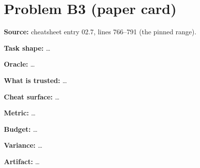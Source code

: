 \documentclass[11pt]{article}
\begin{document}
\section*{Problem B3 (paper card)}\label{ans:B3}
\begin{answer}
\textbf{Source:} cheatsheet entry 02.7, lines 766--791 (the pinned range).

\textbf{Task shape:} \dots

\textbf{Oracle:} \dots

\textbf{What is trusted:} \dots

\textbf{Cheat surface:} \dots

\textbf{Metric:} \dots

\textbf{Budget:} \dots

\textbf{Variance:} \dots

\textbf{Artifact:} \dots
\end{answer}
\end{document}
